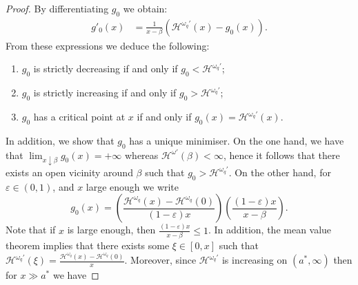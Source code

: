 \documentclass[10pt,a4paper]{amsart}
\newcommand{\cH}{\mathcal{H}}
\newcommand{\homega}{\omega_q}
\newcommand{\PAR}[1]{{{\left(#1\right)}}} %
\renewcommand{\leq}{\leqslant}
\begin{document}
\begin{proof}
		By differentiating $g_0$ we obtain:
	\begin{align*}
		g'_{0}(x)&=\frac{1}{x-\beta}(\cH^{\homega\prime}(x) - g_0(x)).
	\end{align*}
	From these expressions we deduce the following:
	\begin{enumerate}
		\item $g_0$ is strictly decreasing if and only if $ g_0 < \cH^{\homega\prime}$;
		\item $g_0$ is strictly increasing if and only if $ g_0 > \cH^{\homega\prime}$;
		\item $g_0$ has a critical point at $x$ if and only if $ g_0(x) = \cH^{\homega\prime}(x)$.
	\end{enumerate}
	In addition, we show that $g_0$ has a unique minimiser. On the one hand, we have that $\lim_{x\downarrow \beta}g_0(x) = + \infty$ whereas $\cH^{\omega\prime}(\beta)< \infty$, hence it follows that there exists an open vicinity around $\beta$ such that $g_0 > \cH^{\homega\prime}$. On the other hand, for $\varepsilon \in (0,1)$, and $x$ large enough we write 
	\[
	g_0(x) = \PAR{\frac{\cH^{\homega}(x) - \cH^{\homega}(0)}{(1-\varepsilon)x}}\PAR{\frac{(1-\varepsilon)x}{x-\beta}}.
	\]
	Note that if $x$ is large enough, then $\frac{(1-\varepsilon)x}{x-\beta}\leq 1$. In addition, the mean value theorem implies that there exists some $\xi \in [0,x]$ such that $\cH^{\homega\prime}(\xi) = \frac{\cH^{\homega}(x) - \cH^{\homega}(0)}{x}$. Moreover, since $\cH^{\homega\prime}$ is increasing on $(a^\ast,\infty)$ then for $x \gg a^\ast$ we have

\end{proof}
\end{document}
